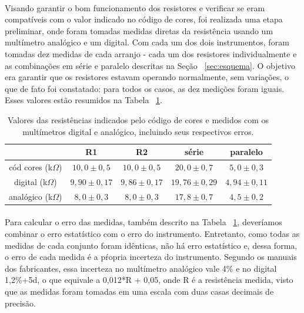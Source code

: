 \documentclass[11pt,a4paper]{article}
\begin{document}
    \paragraph{}
    Visando garantir o bom funcionamento dos resistores e verificar se eram compatíveis com o valor indicado no código de cores, foi realizada uma etapa preliminar, onde foram tomadas medidas diretas da resistência usando um multímetro analógico e um digital. Com cada um dos dois instrumentos, foram tomadas dez medidas de cada arranjo - cada um dos resistores individualmente e as combinações em série e paralelo descritas na Seção ~\ref{sec:esquema}. O objetivo era garantir que os resistores estavam operando normalmente, sem variações, o que de fato foi constatado: para todos os casos, as dez medições foram iguais. Esses valores estão resumidos na Tabela ~\ref{tab:diretas}.

    \begin{table}[htb!]
      \centering 
      \begin{tabular}{c|cccc}
        \toprule
                               &  R1            &  R2             & série          & paralelo      \\
        \midrule
        cód cores (k$\Omega$)  & $10,0 \pm 0,5 $  & $10,0 \pm 0,5$  & $20,0 \pm 0,7$   & $5,0 \pm 0,3$   \\   
        digital   (k$\Omega$)  & $9,90 \pm 0,17$ & $9,86 \pm 0,17$ & $19,76 \pm 0,29$ & $4,94 \pm 0,11$ \\
        analógico (k$\Omega$)  & $8,0 \pm 0,3$    & $8,0 \pm 0,3$    & $17,8 \pm 0,7$   & $4,5 \pm 0,2$   \\
        \bottomrule
      \end{tabular}
      \caption{Valores das resistências indicados pelo código de cores e medidos com os multímetros digital e analógico, incluindo seus respectivos erros.}
      \label{tab:diretas}
    \end{table}
    
    \paragraph{}
    Para calcular o erro das medidas, também descrito na Tabela ~\ref{tab:diretas}, deveríamos combinar o erro estatístico com o erro do instrumento. Entretanto, como todas as medidas de cada conjunto foram idênticas, não há erro estatístico e, dessa forma, o erro de cada medida é a pŕopria incerteza do instrumento. Segundo os manuais dos fabricantes, essa incerteza no multímetro analógico vale 4\% e no digital 1,2\%+5d, o que equivale a 0,012*R + 0,05, onde R é a resistência medida, visto que as medidas foram tomadas em uma escala com duas casas decimais de precisão.
\end{document}
